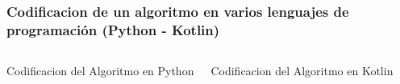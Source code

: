 \begin{frame}
\frametitle{Codificacion de un algoritmo en varios lenguajes de programaci\'on (Python - Kotlin)} 
\begin{columns}
\begin{block}{Codificacion del Algoritmo en Python}
\inputminted[linenos,fontsize=\tiny]{python}{00_IntroProgramacionYMoviles/Hello.py}
\end{block}
\begin{block}{Codificacion del Algoritmo en Kotlin}
\inputminted[linenos,fontsize=\tiny]{python}{00_IntroProgramacionYMoviles/Hello.kt}
\end{block}
\end{columns}
\end{frame}




